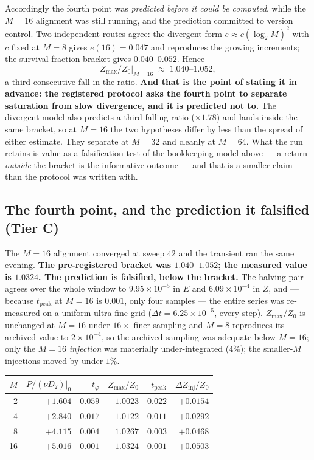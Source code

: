 \documentclass[11pt,a4paper]{article}
\newcommand{\tC}{\textcolor{TierC}{\textbf{Tier C}}}
\theoremstyle{definition}
\theoremstyle{plain}
\begin{document}
Accordingly the fourth point was \emph{predicted before it could be computed}, while the $M=16$
alignment was still running, and the prediction committed to version control. Two independent
routes agree: the divergent form $e \approx c(\log_2 M)^2$ with $c$ fixed at $M=8$ gives
$e(16)=0.047$ and reproduces the growing increments; the survival-fraction bracket gives
$0.040$--$0.052$. Hence
\[
  Z_{\max}/Z_0 \big|_{M=16} \;\approx\; 1.040\text{--}1.052,
\]
a third consecutive fall in the ratio. \textbf{And that is the point of stating it in advance:
the registered protocol asks the fourth point to separate saturation from slow divergence, and
it is predicted not to.} The divergent model also predicts a third falling ratio ($\times1.78$)
and lands inside the same bracket, so at $M=16$ the two hypotheses differ by less than the
spread of either estimate. They separate at $M=32$ and cleanly at $M=64$. What the run retains
is value as a falsification test of the bookkeeping model above --- a return \emph{outside} the
bracket is the informative outcome --- and that is a smaller claim than the protocol was written
with.

\subsection{The fourth point, and the prediction it falsified (\tC{})}
\label{sec:fourth}

The $M=16$ alignment converged at sweep $42$ and the transient ran the same evening.
\textbf{The pre-registered bracket was $1.040$--$1.052$; the measured value is $1.0324$. The
prediction is falsified, below the bracket.} The halving pair agrees over the whole window to
$9.95\times10^{-5}$ in $E$ and $6.09\times10^{-4}$ in $Z$, and --- because $t_{\mathrm{peak}}$
at $M=16$ is $0.001$, only four samples --- the entire series was re-measured on a uniform
ultra-fine grid ($\Delta t = 6.25\times10^{-5}$, every step). $Z_{\max}/Z_0$ is unchanged at
$M=16$ under $16\times$ finer sampling and $M=8$ reproduces its archived value to $2\times
10^{-4}$, so the archived sampling was adequate below $M=16$; only the $M=16$ \emph{injection}
was materially under-integrated ($4\%$); the smaller-$M$ injections moved by under $1\%$.

\begin{center}
\small
\begin{tabular}{@{}rrrrrr@{}}
\toprule
$M$ & $P/(\nu D_2)|_{0}$ & $t_\varphi$ & $Z_{\max}/Z_0$ & $t_{\mathrm{peak}}$ & $\Delta Z_{\mathrm{inj}}/Z_0$ \\
\midrule
2  & $+1.604$ & $0.059$ & $1.0023$ & $0.022$ & $+0.0154$ \\
4  & $+2.840$ & $0.017$ & $1.0122$ & $0.011$ & $+0.0292$ \\
8  & $+4.115$ & $0.004$ & $1.0267$ & $0.003$ & $+0.0468$ \\
16 & $+5.016$ & $0.001$ & $\mathbf{1.0324}$ & $0.001$ & $+0.0503$ \\
\bottomrule
\end{tabular}
\end{center}
\end{document}
